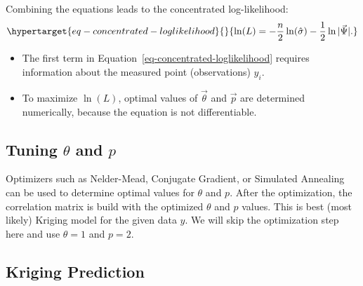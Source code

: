 \documentclass[
  letterpaper,
  DIV=11,
  numbers=noendperiod]{scrreprt}
\providecommand{\tightlist}{%
  \setlength{\itemsep}{0pt}\setlength{\parskip}{0pt}}\usepackage{longtable,booktabs,array}
\begin{document}
Combining the equations leads to the concentrated log-likelihood:
\begin{equation}\protect\hypertarget{eq-concentrated-loglikelihood}{}{\ln(L) = - \frac{n}{2} \ln(\hat{\sigma}) - \frac{1}{2} \ln |\vec{\Psi}|.}\label{eq-concentrated-loglikelihood}\end{equation}

\begin{tcolorbox}[enhanced jigsaw, arc=.35mm, colback=white, bottomtitle=1mm, toprule=.15mm, coltitle=black, titlerule=0mm, leftrule=.75mm, title=\textcolor{quarto-callout-note-color}{\faInfo}\hspace{0.5em}{Note: The Concentrated Log-Likelihood}, opacitybacktitle=0.6, breakable, colbacktitle=quarto-callout-note-color!10!white, opacityback=0, toptitle=1mm, rightrule=.15mm, left=2mm, colframe=quarto-callout-note-color-frame, bottomrule=.15mm]

\begin{itemize}
\tightlist
\item
  The first term in Equation~\ref{eq-concentrated-loglikelihood}
  requires information about the measured point (observations) \(y_i\).
\item
  To maximize \(\ln(L)\), optimal values of \(\vec{\theta}\) and
  \(\vec{p}\) are determined numerically, because the equation is not
  differentiable.
\end{itemize}

\end{tcolorbox}

\hypertarget{tuning-theta-and-p}{%
\subsection{\texorpdfstring{Tuning \(\theta\) and
\(p\)}{Tuning \textbackslash theta and p}}\label{tuning-theta-and-p}}

Optimizers such as Nelder-Mead, Conjugate Gradient, or Simulated
Annealing can be used to determine optimal values for \(\theta\) and
\(p\). After the optimization, the correlation matrix is build with the
optimized \(\theta\) and \(p\) values. This is best (most likely)
Kriging model for the given data \(y\). We will skip the optimization
step here and use \(\theta = 1\) and \(p=2\).

\hypertarget{kriging-prediction}{%
\subsection{Kriging Prediction}\label{kriging-prediction}}
\end{document}
